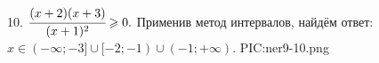 10. $\cfrac{(x+2)(x+3)}{(x+1)^2}\geqslant0.$ Применив метод интервалов, найдём ответ: $x\in(-\infty;-3]\cup[-2;-1)\cup(-1;+\infty).$
{{PIC:ner9-10.png}}\\
